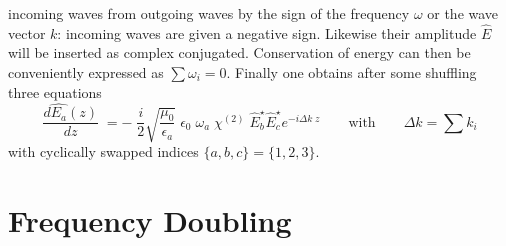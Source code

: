 incoming waves from outgoing waves by the sign of the
frequency $\omega$ or the wave vector $k$: 
incoming waves are given a negative sign.
Likewise their amplitude $\hat{E}$ will be inserted as complex conjugated. Conservation of energy can then be conveniently expressed as $\sum
\omega_i = 0$. Finally one obtains after some shuffling
 three
equations 
\begin{equation}
 \frac{d  \hat{E_a}(z)}{dz} \;
= %
- \; \frac{i}{2}   \sqrt{ \frac{\mu_0} {\epsilon_a}}\;\epsilon_0
  \; \omega_a \; \chi^{(2)} \; \hat{E}_b^{\star} \hat{E}_c^{\star}  e^{-i  \Delta k \; z}
  \qquad \text{with} \qquad \Delta k = \sum k_i
  \label{eq_shg_e_of_z_nl}
\end{equation}
with  cyclically swapped  indices
$\{a,b,c\} = \{1,2,3\} $.


\section{Frequency Doubling}

